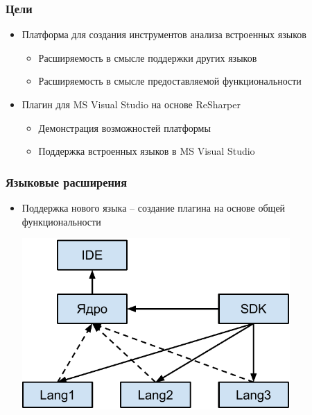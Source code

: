 \documentclass{beamer}
\begin{document}
\begin{frame}[fragile]
	\transwipe[direction=90]
	\frametitle{Цели}
	\begin{itemize}
	    \item Платформа для создания инструментов анализа встроенных языков
    	\begin{itemize}
    		\item Расширяемость в смысле поддержки других языков
        	\item Расширяемость в смысле предоставляемой функциональности
        \end{itemize}
        \item Плагин для MS Visual Studio на основе ReSharper
    	\begin{itemize}
    		\item Демонстрация возможностей платформы
        	\item Поддержка встроенных языков в MS Visual Studio
        \end{itemize}
    \end{itemize}
\end{frame}

\begin{frame}[fragile]
	\transwipe[direction=90]
	\frametitle{Языковые расширения}
	\begin{itemize}
	    \item Поддержка нового языка -- создание плагина на основе общей функциональности
        \begin{center}
            \includegraphics[width=290pt]{picts/Structure.pdf}
        \end{center}
    \end{itemize}
            
\end{frame}
\end{document}
